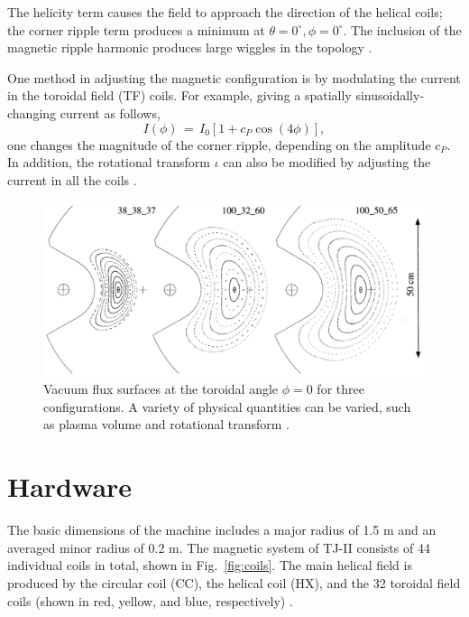 \documentclass[a4paper]{article}
\begin{document}
The helicity term causes the field to approach the direction of the helical coils; the corner ripple term produces a minimum at $\theta = 0^{\circ}, \phi = 0^{\circ}$.
The inclusion of the magnetic ripple harmonic produces large wiggles in the topology \cite{solano_study_1988}.

One method in adjusting the magnetic configuration is by modulating the current in the toroidal field (TF) coils.
For example, giving a spatially sinusoidally-changing current as follows,
\begin{equation}
	I(\phi) \,=\, I_0 \left[1 + c_P\cos(4 \phi)\right],
\end{equation}
one changes the magnitude of the corner ripple, depending on the amplitude $c_P$.
In addition, the rotational transform $\iota$ can also be modified by adjusting the current in all the coils \cite{solano_study_1988}.

\begin{figure}
\centering
	\includegraphics[width=\linewidth]{../Graphics/3_configs.png}
	\caption{Vacuum flux surfaces at the toroidal angle $\phi = 0$ for three configurations. A variety of physical quantities can be varied, such as plasma volume and rotational transform \cite{alejaldre_first_1999}.}
	\label{fig:3_configs}
\end{figure}


\section*{Hardware}
The basic dimensions of the machine includes a major radius of 1.5 m and an averaged minor radius of 0.2 m. The magnetic system of TJ-II consists of 44 individual coils in total, shown in Fig.~\ref{fig:coils}.
The main helical field is produced by the circular coil (CC), the helical coil (HX), and the 32 toroidal field coils (shown in red, yellow, and blue, respectively) \cite{tj-ii_nodate}.
\end{document}
